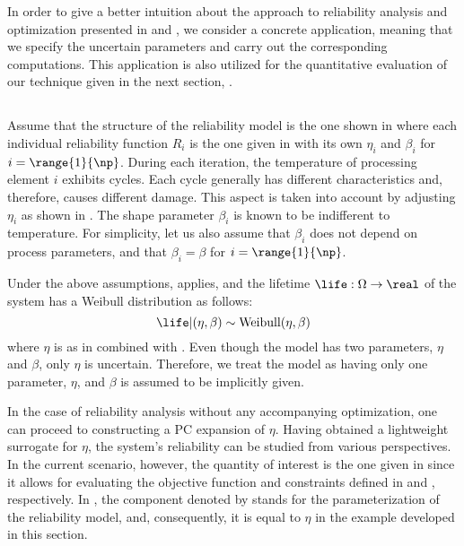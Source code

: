 In order to give a better intuition about the approach to reliability analysis
and optimization presented in  and
, we consider a concrete application,
meaning that we specify the uncertain parameters and carry out the corresponding
computations. This application is also utilized for the quantitative evaluation
of our technique given in the next section, .

\subsection{\problemtitle}

Assume that the structure of the reliability model is the one shown in
 where each individual reliability function $R_i$ is the
one given in  with its own $\eta_i$ and $\beta_i$ for
$i = \range{1}{\np}$. During each iteration, the temperature of processing
element $i$ exhibits  cycles. Each cycle generally has different
characteristics and, therefore, causes different damage. This aspect is taken
into account by adjusting $\eta_i$ as shown in . The
shape parameter $\beta_i$ is known to be indifferent to temperature. For
simplicity, let us also assume that $\beta_i$ does not depend on process
parameters, and that $\beta_i = \beta$ for $i = \range{1}{\np}$.

Under the above assumptions,  applies, and the
lifetime $\life: \Omega \to \real$ of the system has a Weibull distribution as
follows:
\[
  \life | (\eta, \beta) \sim \mathrm{Weibull}(\eta, \beta)
\]
where $\eta$ is as in  combined with
. Even though the model has two parameters, $\eta$
and $\beta$, only $\eta$ is uncertain. Therefore, we treat the model as having
only one parameter, $\eta$, and $\beta$ is assumed to be implicitly given.

In the case of reliability analysis without any accompanying optimization, one
can proceed to constructing a \ac{PC} expansion of $\eta$. Having obtained a
lightweight surrogate for $\eta$, the system's reliability can be studied from
various perspectives. In the current scenario, however, the quantity of interest
\g is the one given in  since it allows for
evaluating the objective function and constraints defined in
 and ,
respectively. In , the component denoted by
\life stands for the parameterization of the reliability model, and,
consequently, it is equal to $\eta$ in the example developed in this section.

